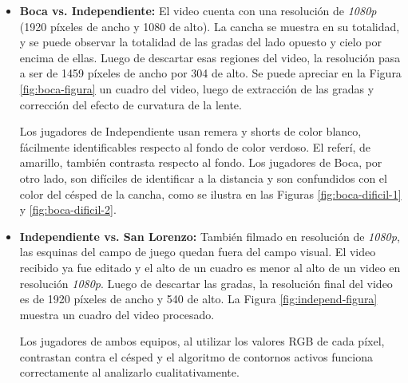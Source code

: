 \begin{itemize}

  \item \textbf{Boca vs. Independiente:} El video cuenta con una resolución de
    \textit{1080p} (1920 píxeles de ancho y 1080 de alto). La cancha se muestra
    en su totalidad, y se puede observar la totalidad de las gradas del lado
    opuesto y cielo por encima de ellas. Luego de descartar esas regiones del
    video, la resolución pasa a ser de 1459 píxeles de ancho por 304 de alto.
    Se puede apreciar en la Figura \ref{fig:boca-figura} un cuadro del video, luego
    de extracción de las gradas y corrección del efecto de curvatura de la
    lente.

    Los jugadores de Independiente usan remera y shorts de color blanco,
    fácilmente identificables respecto al fondo de color verdoso. El referí, de
    amarillo, también contrasta respecto al fondo. Los jugadores de Boca, por
    otro lado, son difíciles de identificar a la distancia y son confundidos
    con el color del césped de la cancha, como se ilustra en las Figuras
    \ref{fig:boca-dificil-1} y \ref{fig:boca-dificil-2}.

  \item \textbf{Independiente vs. San Lorenzo:} También filmado en resolución de
    \textit{1080p}, las esquinas del campo de juego quedan fuera del campo
    visual. El video recibido ya fue editado y el alto de un cuadro es menor al
    alto de un video en resolución \textit{1080p}. Luego de descartar las
    gradas, la resolución final del video es de 1920 píxeles de ancho y 540 de
    alto. La Figura \ref{fig:independ-figura} muestra un cuadro del video
    procesado.

    Los jugadores de ambos equipos, al utilizar los valores RGB de cada píxel,
    contrastan contra el césped y el algoritmo de contornos activos funciona
    correctamente al analizarlo cualitativamente.

\end{itemize}

